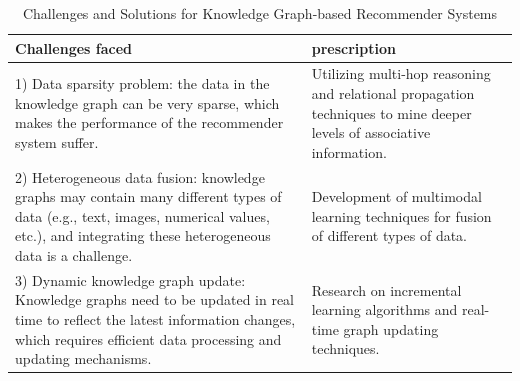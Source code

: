 \begin{table}[h]
\centering
\caption{Challenges and Solutions for Knowledge Graph-based Recommender Systems \parencite{yu2024review}}
\begin{tabular}{|p{}|p{}|}
\hline
\textbf{Challenges faced} & \textbf{prescription} \\
\hline
1) Data sparsity problem: the data in the knowledge graph can be very sparse, which makes the performance of the recommender system suffer. & Utilizing multi-hop reasoning and relational propagation techniques to mine deeper levels of associative information. \\
\hline
2) Heterogeneous data fusion: knowledge graphs may contain many different types of data (e.g., text, images, numerical values, etc.), and integrating these heterogeneous data is a challenge. & Development of multimodal learning techniques for fusion of different types of data. \\
\hline
3) Dynamic knowledge graph update: Knowledge graphs need to be updated in real time to reflect the latest information changes, which requires efficient data processing and updating mechanisms. & Research on incremental learning algorithms and real-time graph updating techniques. \\
\hline
\end{tabular}
\end{table}